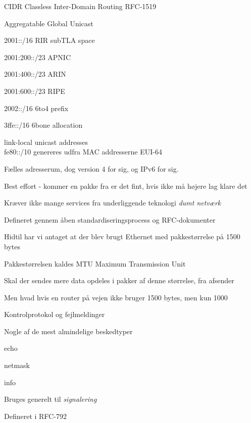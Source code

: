 \documentclass[Screen16to9,17pt]{foils}
\begin{document}

\begin{list1}
\item CIDR Classless Inter-Domain Routing RFC-1519
\item Aggregatable Global Unicast
\item 2001::/16 RIR subTLA space
\begin{list2}
\item 2001:200::/23 APNIC
\item 2001:400::/23 ARIN
\item 2001:600::/23 RIPE
\end{list2}
\item 2002::/16 6to4 prefix
\item 3ffe::/16 6bone allocation
\item link-local unicast addresses\\
fe80::/10 genereres udfra MAC addresserne EUI-64
\end{list1}




\begin{list1}
\item Fælles adresserum, dog version 4 for sig, og IPv6 for sig.
\item Best effort - kommer en pakke fra er det fint, hvis ikke må højere lag klare det
\item Kræver ikke mange services fra underliggende teknologi \emph{dumt netværk}
\item Defineret gennem åben standardiseringsprocess og RFC-dokumenter
\end{list1}


\begin{list1}
\item Hidtil har vi antaget at der blev brugt Ethernet med pakkestørrelse på 1500 bytes
\item Pakkestørrelsen kaldes MTU Maximum Transmission Unit
\item Skal der sendes mere data opdeles i pakker af denne størrelse, fra afsender
\item Men hvad hvis en router på vejen ikke bruger 1500 bytes, men kun 1000
\end{list1}


\begin{list1}
\item Kontrolprotokol og fejlmeldinger
\item Nogle af de mest almindelige beskedtyper
\begin{list2}
\item echo
\item netmask
\item info
\end{list2}
\item Bruges generelt til \emph{signalering}
\item Defineret i RFC-792
\end{list1}
\end{document}
